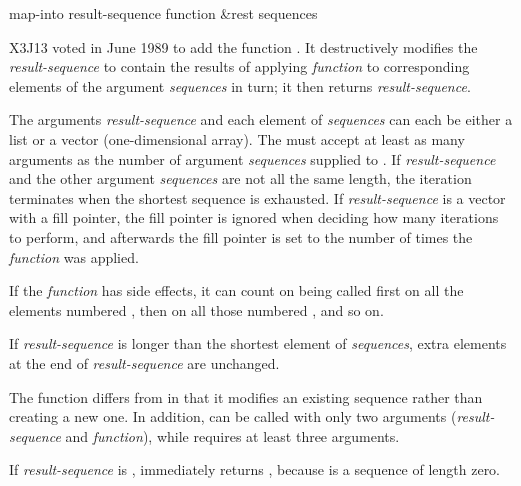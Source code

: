 \begin{newer}
\begin{defun}[Function]
map-into result-sequence function &rest sequences

    X3J13 voted in June 1989  to add the function .
    It destructively modifies the {\it result-sequence} to contain the results of
    applying {\it function} to corresponding elements of
    the argument {\it sequences} in turn; it then
    returns {\it result-sequence}.

    The arguments {\it result-sequence}
    and each element of {\it sequences} can each be
    either a list or a vector (one-dimensional array).
    The  must accept at least as many arguments as the
    number of argument {\it sequences} supplied to .
    If {\it result-sequence} and
    the other argument {\it sequences} are not all the same length, the iteration
    terminates when the shortest sequence is exhausted.  If {\it result-sequence}
    is a vector with a fill pointer, the fill pointer is ignored when
    deciding how many iterations to perform, and afterwards the
    fill pointer is set to the number of times the {\it function} was applied.

If the {\it function} has side effects, it can count on being called
first on all the elements numbered , then on all those
numbered , and so on.

    If {\it result-sequence} is longer than the shortest element of {\it sequences},
    extra elements at the end of {\it result-sequence} are unchanged.

    The function  differs from  in that it modifies
an existing sequence rather than creating a new one.  In addition,
 can be called with only two arguments ({\it result-sequence}
and {\it function}), while  requires at least three arguments.

If {\it result-sequence} is ,  immediately returns
, because  is a sequence of length zero.
\end{defun}
\end{newer}


